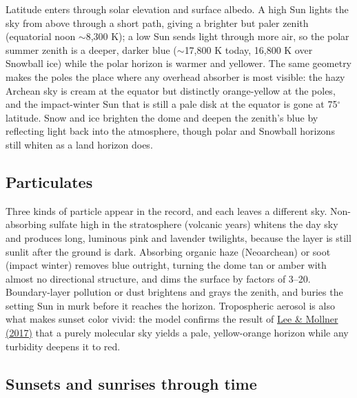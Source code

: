 \documentclass[9pt,twocolumn]{extarticle}
\begin{document}
Latitude enters through solar elevation and surface albedo. A high Sun lights the sky from above through a short path, giving a brighter but paler zenith (equatorial noon $\sim$8,300 K); a low Sun sends light through more air, so the polar summer zenith is a deeper, darker blue ($\sim$17,800 K today, 16,800 K over Snowball ice) while the polar horizon is warmer and yellower. The same geometry makes the poles the place where any overhead absorber is most visible: the hazy Archean sky is cream at the equator but distinctly orange-yellow at the poles, and the impact-winter Sun that is still a pale disk at the equator is gone at 75$^\circ$ latitude. Snow and ice brighten the dome and deepen the zenith's blue by reflecting light back into the atmosphere, though polar and Snowball horizons still whiten as a land horizon does.


\subsection{Particulates}\label{particulates}

Three kinds of particle appear in the record, and each leaves a different sky. Non-absorbing sulfate high in the stratosphere (volcanic years) whitens the day sky and produces long, luminous pink and lavender twilights, because the layer is still sunlit after the ground is dark. Absorbing organic haze (Neoarchean) or soot (impact winter) removes blue outright, turning the dome tan or amber with almost no directional structure, and dims the surface by factors of 3--20. Boundary-layer pollution or dust brightens and grays the zenith, and buries the setting Sun in murk before it reaches the horizon. Tropospheric aerosol is also what makes sunset color vivid: the model confirms the result of \protect\hyperlink{cite.lee2017}{Lee \& Mollner (2017)} that a purely molecular sky yields a pale, yellow-orange horizon while any turbidity deepens it to red.


\subsection{Sunsets and sunrises through time}\label{sunsets-and-sunrises-through-time}
\end{document}
